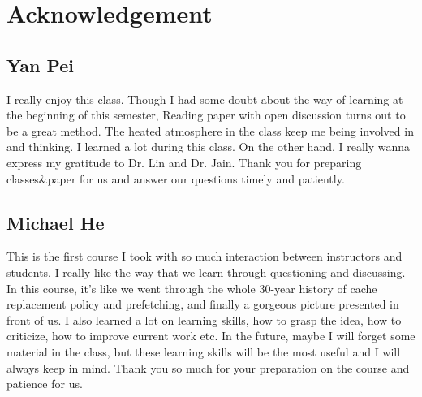 \section*{Acknowledgement}
\label{sec:acknowledge}

  \subsection*{Yan Pei}
  \label{sec:ypeiack}
  I really enjoy this class. Though I had some doubt about the way of learning at the beginning of this semester, Reading paper with open discussion turns out to be a great method. The heated atmosphere in the class keep me being involved in and thinking. I learned a lot during this class. On the other hand, I really wanna express my gratitude to Dr. Lin and Dr. Jain. Thank you for preparing classes\&paper for us and answer our questions timely and patiently.

  \subsection*{Michael He}
  \label{sec:jyheack}
 This is the first course I took with so much interaction between instructors and students. I really like the way that we learn through questioning and discussing. In this course, it's like we went through the whole 30-year history of cache replacement policy and prefetching, and finally a gorgeous picture presented in front of us. I also learned a lot on learning skills, how to grasp the idea, how to criticize, how to improve current work etc. In the future, maybe I will forget some material in the class, but these learning skills will be the most useful and I will always keep in mind. Thank you so much for your preparation on the course and patience for us.
